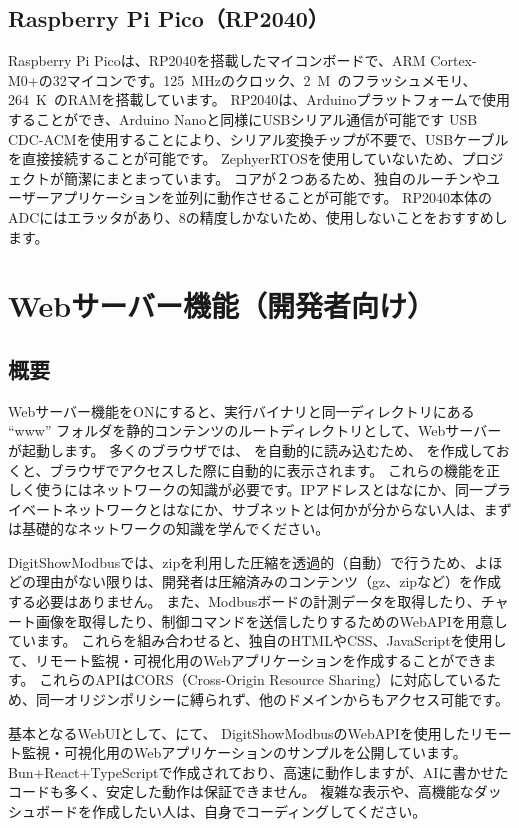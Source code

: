 \subsection{Raspberry Pi Pico（RP2040）}
Raspberry Pi Picoは、RP2040を搭載したマイコンボードで、ARM Cortex-M0+の\qty{32}{\bit}マイコンです。\qty{125}{MHz}のクロック、\qty{2}{M\byte}のフラッシュメモリ、\qty{264}{K\byte}のRAMを搭載しています。
RP2040は、Arduinoプラットフォームで使用することができ、Arduino Nanoと同様にUSBシリアル通信が可能です
USB CDC-ACMを使用することにより、シリアル変換チップが不要で、USBケーブルを直接接続することが可能です。
ZephyerRTOSを使用していないため、プロジェクトが簡潔にまとまっています。
コアが２つあるため、独自のルーチンやユーザーアプリケーションを並列に動作させることが可能です。
RP2040本体のADCにはエラッタがあり、\qty{8}{\bit}の精度しかないため、使用しないことをおすすめします。

\section{Webサーバー機能（開発者向け）}
\subsection{概要}
Webサーバー機能をONにすると、実行バイナリと同一ディレクトリにある ``www'' フォルダを静的コンテンツのルートディレクトリとして、Webサーバーが起動します。
多くのブラウザでは、 を自動的に読み込むため、 を作成しておくと、ブラウザでアクセスした際に自動的に表示されます。
これらの機能を正しく使うにはネットワークの知識が必要です。IPアドレスとはなにか、同一プライベートネットワークとはなにか、サブネットとは何かが分からない人は、まずは基礎的なネットワークの知識を学んでください。

DigitShowModbusでは、zipを利用した圧縮を透過的（自動）で行うため、よほどの理由がない限りは、開発者は圧縮済みのコンテンツ（gz、zipなど）を作成する必要はありません。
また、Modbusボードの計測データを取得したり、チャート画像を取得したり、制御コマンドを送信したりするためのWebAPIを用意しています。
これらを組み合わせると、独自のHTMLやCSS、JavaScriptを使用して、リモート監視・可視化用のWebアプリケーションを作成することができます。
これらのAPIはCORS（Cross-Origin Resource Sharing）に対応しているため、同一オリジンポリシーに縛られず、他のドメインからもアクセス可能です。

基本となるWebUIとして、にて、
DigitShowModbusのWebAPIを使用したリモート監視・可視化用のWebアプリケーションのサンプルを公開しています。
Bun+React+TypeScriptで作成されており、高速に動作しますが、AIに書かせたコードも多く、安定した動作は保証できません。
複雑な表示や、高機能なダッシュボードを作成したい人は、自身でコーディングしてください。

